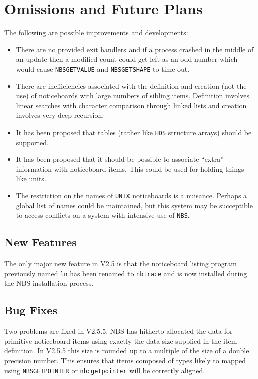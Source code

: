 \documentclass[twoside,11pt]{article}
\renewcommand{\_}{\texttt{\symbol{95}}}
\begin{document}
\section {Omissions and Future Plans}

The following are possible improvements and developments:

\begin {itemize}
\item There are no provided exit handlers and if a process crashed in the
middle of an update then a modified count could get left as an odd number which
would cause {\tt NBS\_GET\_VALUE} and {\tt NBS\_GET\_SHAPE} to time out.
\item There are inefficiencies associated with the definition and creation
(not the use) of noticeboards with large numbers of sibling items. Definition
involves linear searches with character comparison through linked lists
and creation involves very deep recursion.
\item It has been proposed that tables (rather like {\tt HDS} structure arrays)
should be supported.
\item It has been proposed that it should be possible to associate ``extra''
information with noticeboard items. This could be used for holding things like
units.
\item The restriction on the names of {\tt UNIX} noticeboards is a
nuisance. Perhaps a global list of names could be maintained, but this
system may be succeptible to access conflicts on a system with intensive
use of {\tt NBS}.
\end {itemize}

\subsection{New Features}
\label{V2.5 New Features}
The only major new feature in V2.5 is that the noticeboard listing
program previously named {\tt ln} has been renamed to {\tt nbtrace} and
is now installed during the NBS installation process. 

\subsection {Bug Fixes}

Two problems are fixed in V2.5.5. NBS has hitherto allocated the data for
primitive noticeboard items using exactly the data size supplied in the
item definition. In V2.5.5 this size is rounded up to a multiple of the
size of a double precision number. This ensures that items composed of
types likely to mapped using {\tt NBS\_GET\_POINTER} or 
{\tt nbc\_get\_pointer} will be correctly aligned.
\end{document}
